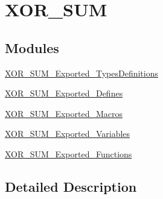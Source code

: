 \hypertarget{group___x_o_r___s_u_m}{}\section{X\+O\+R\+\_\+\+S\+UM}
\label{group___x_o_r___s_u_m}
\subsection*{Modules}
\begin{DoxyCompactItemize}
\item 
\mbox{\hyperlink{group___x_o_r___s_u_m___exported___types_definitions}{X\+O\+R\+\_\+\+S\+U\+M\+\_\+\+Exported\+\_\+\+Types\+Definitions}}
\item 
\mbox{\hyperlink{group___x_o_r___s_u_m___exported___defines}{X\+O\+R\+\_\+\+S\+U\+M\+\_\+\+Exported\+\_\+\+Defines}}
\item 
\mbox{\hyperlink{group___x_o_r___s_u_m___exported___macros}{X\+O\+R\+\_\+\+S\+U\+M\+\_\+\+Exported\+\_\+\+Macros}}
\item 
\mbox{\hyperlink{group___x_o_r___s_u_m___exported___variables}{X\+O\+R\+\_\+\+S\+U\+M\+\_\+\+Exported\+\_\+\+Variables}}
\item 
\mbox{\hyperlink{group___x_o_r___s_u_m___exported___functions}{X\+O\+R\+\_\+\+S\+U\+M\+\_\+\+Exported\+\_\+\+Functions}}
\end{DoxyCompactItemize}


\subsection{Detailed Description}
